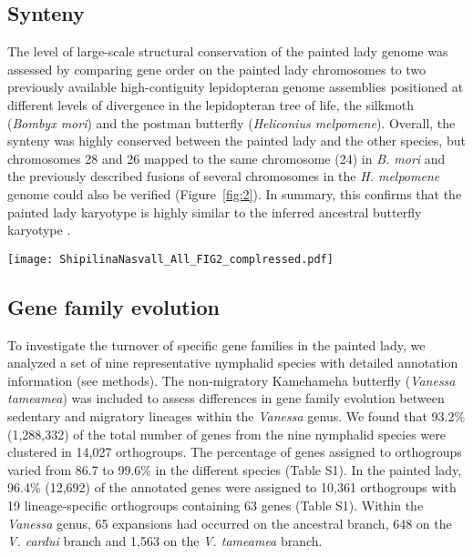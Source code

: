 \documentclass[twocolumn]{bmcart}%
\begin{document}
\subsection*{Synteny}
The level of large-scale structural conservation of the painted lady genome was assessed by comparing gene order on the painted lady chromosomes to two previously available high-contiguity lepidopteran genome assemblies positioned at different levels of divergence in the lepidopteran tree of life, the silkmoth (\textit{Bombyx mori}) and the postman butterfly (\textit{Heliconius melpomene}). Overall, the synteny was highly conserved between the painted lady and the other species, but chromosomes 28 and 26 mapped to the same chromosome (24) in \textit{B. mori} and the previously described fusions of several chromosomes in the \textit{H. melpomene} genome \cite{daveyNoEvidenceMaintenance2017} could also be verified (Figure~\ref{fig:2}). In summary, this confirms that the painted lady karyotype is highly similar to the inferred ancestral butterfly karyotype \cite{aholaGlanvilleFritillaryGenome2014}.

\begin{figure*}
    \centering
    \texttt{[image: ShipilinaNasvall\_All\_FIG2\_complressed.pdf]}
    \caption{Synteny between the painted lady and a) the silkmoth (\textit{Bombyx mori}) and b) the postman butterfly (\textit{Heliconius melpomene}) chromosomes, respectively. The painted lady autosomes are sorted and named according to length and the sex chromosomes are indicated with Z and W. Orthologous genes are connected with lines. Colors represent individual chromosomes.}
    \label{fig:2}
\end{figure*}



\subsection*{Gene family evolution}
To investigate the turnover of specific gene families in the painted lady, we analyzed a set of nine representative nymphalid species with detailed annotation information (see methods). The non-migratory Kamehameha butterfly (\textit{Vanessa tameamea}) was included to assess differences in gene family evolution between sedentary and migratory lineages within the \textit{Vanessa} genus. We found that 93.2\% (1,288,332) of the total number of genes from the nine nymphalid species were clustered in 14,027 orthogroups. The percentage of genes assigned to orthogroups varied from 86.7 to 99.6\% in the different species (Table S1). In the painted lady, 96.4\% (12,692) of the annotated genes were assigned to 10,361 orthogroups with 19 lineage-specific orthogroups containing 63 genes (Table S1). Within the \textit{Vanessa} genus, 65 expansions had occurred on the ancestral branch, 648 on the \textit{V. cardui} branch and 1,563 on the \textit{V. tameamea} branch.
\end{document}
